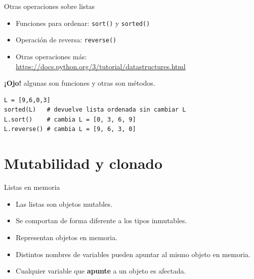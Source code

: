\documentclass[mathserif]{beamer}
\begin{document}




\begin{frame}[fragile]{Otras operaciones sobre listas}
    \begin{itemize}
        \item Funciones para ordenar: \lstinline|sort()| y \lstinline|sorted()|
        \item Operación de {\blue reversa}: \lstinline|reverse()|
        \item Otras operaciones más: \url{https://docs.python.org/3/tutorial/datastructures.html}
    \end{itemize}
    
    {\blue\bfseries ¡Ojo!} algunas son {\blue funciones} y otras son {\orange métodos}. 
    
\begin{lstlisting}
L = [9,6,0,3]
sorted(L)   # devuelve lista ordenada sin cambiar L
L.sort()    # cambia L = [0, 3, 6, 9]
L.reverse() # cambia L = [9, 6, 3, 0]
\end{lstlisting}
\end{frame}


\section{Mutabilidad y clonado}

\begin{frame}[fragile]{Listas en memoria}
    \begin{itemize}
        \item Las listas son objetos {\blue mutables}.
        \item Se comportan de forma diferente a los tipos inmutables.
        \item Representan {\orange objetos en memoria}. 
        \item Distintos {\orange nombres de variables} pueden apuntar al mismo objeto en memoria.
        \item Cualquier variable que {\blue\bfseries apunte } a un objeto es afectada.
    \end{itemize}
    
\end{frame}
\end{document}
